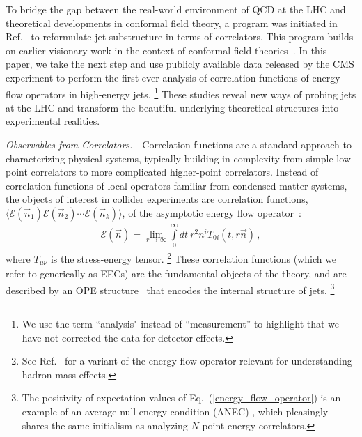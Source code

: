 \documentclass[aps,prl,twocolumn,showpacs,10pt,superscriptaddress,preprintnumbers,nofootinbib,longbibliography]{revtex4-1}
\DeclareRobustCommand{\Eq}[1]{Eq.~(\ref{#1})}
\begin{document}
To bridge the gap between the real-world environment of QCD at the LHC and theoretical developments in conformal field theory, a program was initiated in Ref.~\cite{Chen:2020vvp} to reformulate jet substructure in terms of correlators.
%
This program builds on earlier visionary work in the context of conformal field theories~\cite{Hofman:2008ar,Belitsky:2013xxa,Belitsky:2013bja,Belitsky:2013ofa,Belitsky:2014zha,Korchemsky:2015ssa}.
%
In this paper, we take the next step and use publicly available data released by the CMS experiment to perform the first ever analysis of correlation functions of energy flow operators in high-energy jets.%
%
\footnote{We use the term ``analysis" instead of ``measurement'' to highlight that we have not corrected the data for detector effects.}
%
These studies reveal new ways of probing jets at the LHC and transform the beautiful underlying theoretical structures into experimental realities.




\emph{Observables from Correlators.}---Correlation functions are a standard approach to characterizing physical systems, typically building in complexity from simple low-point correlators to more complicated higher-point correlators.
%
Instead of correlation functions of local operators familiar from condensed matter systems, the objects of interest in collider experiments are correlation functions, $\langle \mathcal{E}(\vec n_1) \mathcal{E}(\vec n_2) \cdots \mathcal{E}(\vec n_k) \rangle$, of the asymptotic energy flow operator~\cite{Sveshnikov:1995vi,Tkachov:1995kk,Korchemsky:1999kt,Bauer:2008dt,Hofman:2008ar,Belitsky:2013xxa,Belitsky:2013bja,Kravchuk:2018htv}:
%
\begin{align}
\label{energy_flow_operator}
\mathcal{E}(\vec n) = \lim_{r\to \infty} \int\limits_0^\infty dt~ r^2 n^i T_{0i}(t,r \vec n)\,,
\end{align}
%
where $T_{\mu\nu}$ is the stress-energy tensor.%
%
\footnote{See Ref.~\cite{Mateu:2012nk} for a variant of the energy flow operator relevant for understanding hadron mass effects.}
%
These correlation functions (which we refer to generically as EECs) are the fundamental objects of the theory, and are described by an OPE structure~\cite{Hofman:2008ar,Kravchuk:2018htv,Kologlu:2019bco,Kologlu:2019mfz,1822249} that encodes the internal structure of jets.%
%
\footnote{The positivity of expectation values of \Eq{energy_flow_operator} is an example of an average null energy condition (ANEC) \cite{Tipler:1978zz,Klinkhammer:1991ki,Wald:1991xn,Hofman:2008ar,Faulkner:2016mzt,Hartman:2016lgu}, which pleasingly shares the same initialism as analyzing $N$-point energy correlators.}
\end{document}
